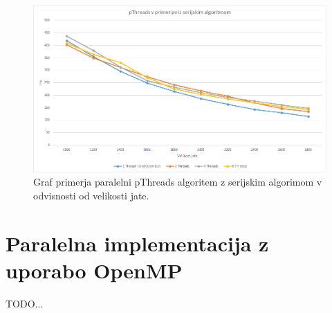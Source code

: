 \documentclass[a4paper, 12pt]{book}
\begin{document}
\begin{figure}[t]
\includegraphics[width=\textwidth]{graf_pthreads}
\caption{Graf primerja paralelni pThreads algoritem z serijskim algorimom v odvisnosti od velikosti jate.}
\label{img:graf_pthreads}
\centering
\end{figure}

\chapter{Paralelna implementacija z uporabo OpenMP}
\label{ch3}
TODO...
\end{document}
